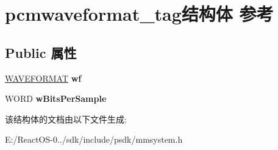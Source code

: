 \hypertarget{structpcmwaveformat__tag}{}\section{pcmwaveformat\+\_\+tag结构体 参考}
\label{structpcmwaveformat__tag}
\subsection*{Public 属性}
\begin{DoxyCompactItemize}
\item 
\mbox{\label{structpcmwaveformat__tag_a1b63dbb01cce141a37d6377c5974f4e6}} 
\hyperlink{structwaveformat__tag}{W\+A\+V\+E\+F\+O\+R\+M\+AT} {\bfseries wf}
\item 
\mbox{\label{structpcmwaveformat__tag_a623a7f97ed8ddd856079a8705ae59ec2}} 
W\+O\+RD {\bfseries w\+Bits\+Per\+Sample}
\end{DoxyCompactItemize}


该结构体的文档由以下文件生成\+:\begin{DoxyCompactItemize}
\item 
E\+:/\+React\+O\+S-\/0../sdk/include/psdk/mmsystem.\+h\end{DoxyCompactItemize}

